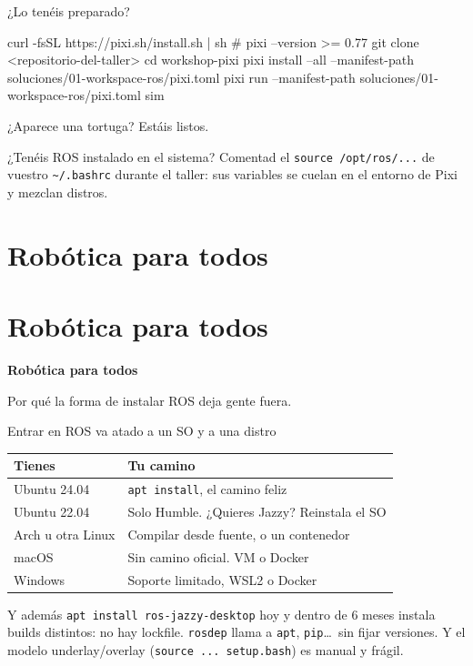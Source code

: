 \documentclass[aspectratio=169]{beamer}
\newcommand{\separador}[2]{%
\begin{frame}
  \centering
  \vfill
  {\usebeamercolor[fg]{structure}\fontsize{34}{40}\selectfont\bfseries #1\par}
  \vspace{1.2em}
  {\Large\color{halfgray} #2\par}
  \vfill
\end{frame}%
}
\newcommand{\seccion}[3][]{%
  \if\relax\detokenize{#1}\relax\section{#2}\else\section[#1]{#2}\fi
  \separador{#2}{#3}%
}
\begin{document}
\begin{frame}[fragile]{¿Lo tenéis preparado?}
\begin{terminal}
curl -fsSL https://pixi.sh/install.sh | sh     # pixi --version >= 0.77
git clone <repositorio-del-taller>
cd workshop-pixi
pixi install --all --manifest-path soluciones/01-workspace-ros/pixi.toml
pixi run --manifest-path soluciones/01-workspace-ros/pixi.toml sim
\end{terminal}
\vfill
\centering ¿Aparece una tortuga? Estáis listos.
\vfill
\begin{alertblock}{¿Tenéis ROS instalado en el sistema?}
Comentad el \lstinline|source /opt/ros/...| de vuestro \lstinline|~/.bashrc| durante el taller: sus variables se cuelan en el entorno de Pixi y mezclan distros.
\end{alertblock}
\end{frame}

\seccion{Robótica para todos}{Por qué la forma de instalar ROS deja gente fuera.}

\begin{frame}{Entrar en ROS va atado a un SO y a una distro}
\centering
\begin{tabular}{ll}
\toprule
\textbf{Tienes} & \textbf{Tu camino} \\
\midrule
Ubuntu 24.04 & \lstinline|apt install|, el camino feliz \\
Ubuntu 22.04 & Solo Humble. ¿Quieres Jazzy? Reinstala el SO \\
Arch u otra Linux & Compilar desde fuente, o un contenedor \\
macOS & Sin camino oficial. VM o Docker \\
Windows & Soporte limitado, WSL2 o Docker \\
\bottomrule
\end{tabular}
\vfill
\begin{block}{Y además}
\lstinline|apt install ros-jazzy-desktop| hoy y dentro de 6 meses instala builds distintos: no hay lockfile. \texttt{rosdep} llama a \texttt{apt}, \texttt{pip}\ldots\ sin fijar versiones. Y el modelo underlay/overlay (\lstinline|source ... setup.bash|) es manual y frágil.
\end{block}
\end{frame}
\end{document}
